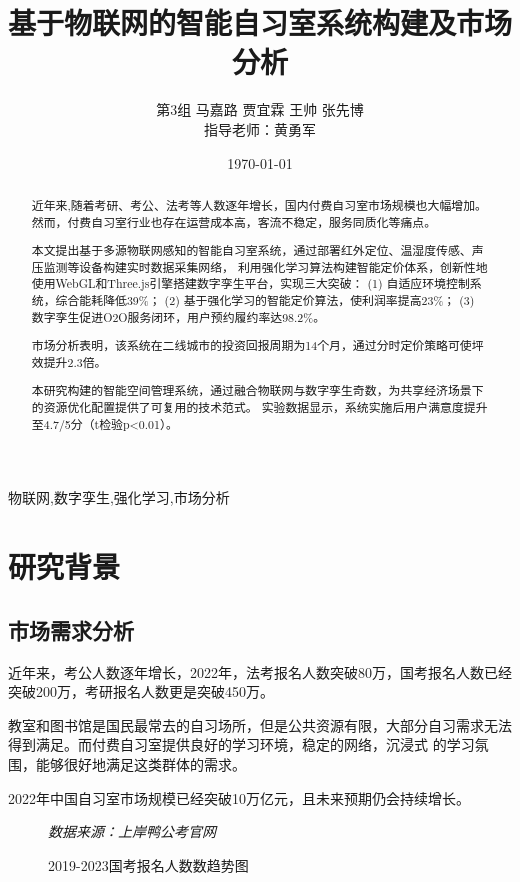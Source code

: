 \documentclass[12pt,a4paper]{IEEEtran} %
\title{基于物联网的智能自习室系统构建及市场分析}
\author{第3组 \quad  马嘉路 \quad 贾宜霖 \quad 王帅 \quad  张先博  \\ 指导老师：黄勇军}
\date{\today}
\begin{document}
\maketitle

\begin{abstract}
  近年来,随着考研、考公、法考等人数逐年增长，国内付费自习室市场规模也大幅增加。
  然而，付费自习室行业也存在运营成本高，客流不稳定，服务同质化等痛点。

  本文提出基于多源物联网感知的智能自习室系统，通过部署红外定位、温湿度传感、声压监测等设备构建实时数据采集网络，
  利用强化学习算法构建智能定价体系，创新性地使用WebGL和Three.js引擎搭建数字孪生平台，实现三大突破：
  (1) 自适应环境控制系统，综合能耗降低39\%；
  (2) 基于强化学习的智能定价算法，使利润率提高23\%；
  (3) 数字孪生促进O2O服务闭环，用户预约履约率达98.2\%。

  市场分析表明，该系统在二线城市的投资回报周期为14个月，通过分时定价策略可使坪效提升2.3倍。

  本研究构建的智能空间管理系统，通过融合物联网与数字孪生奇数，为共享经济场景下的资源优化配置提供了可复用的技术范式。
  实验数据显示，系统实施后用户满意度提升至4.7/5分（t检验p<0.01）。
\end{abstract}

\begin{IEEEkeywords}
  物联网,数字孪生,强化学习,市场分析
\end{IEEEkeywords}

\section{研究背景}
\subsection{市场需求分析}

近年来，考公人数逐年增长，2022年，法考报名人数突破80万，国考报名人数已经突破200万，考研报名人数更是突破450万\cite{duck}。

教室和图书馆是国民最常去的自习场所，但是公共资源有限，大部分自习需求无法得到满足。而付费自习室提供良好的学习环境，稳定的网络，沉浸式
的学习氛围，能够很好地满足这类群体的需求。

2022年中国自习室市场规模已经突破10万亿元\cite{aimei}，且未来预期仍会持续增长。
\begin{figure}[htbp]
  \centering
  \caption{2019-2023国考报名人数数趋势图}
  \small\textit{数据来源：上岸鸭公考官网}
\end{figure}
\end{document}
